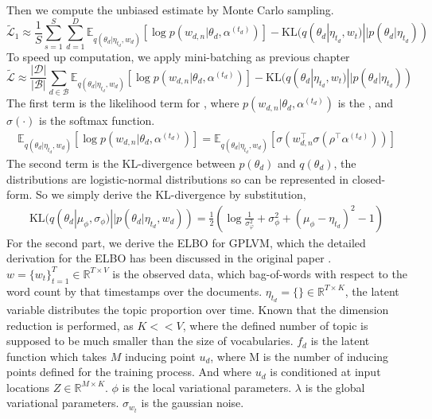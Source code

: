 Then we compute the unbiased estimate by Monte Carlo sampling.
\begin{equation}
\tilde{\mathcal{L}}_{1}\approx\frac{1}{S}\sum_{s=1}^{S}\sum_{d=1}^{D}\mathbb{E}_{ q(\theta_d|\eta_{t_d},w_d)}[\log p(w_{d,n}|\theta_d,\alpha^{(t_d)})]-\text{KL}(q(\theta_d|\eta_{t_d},w_t)||p(\theta_d|\eta_{t_d}))
\end{equation}
To speed up computation, we apply mini-batching as previous chapter
\begin{equation}
\tilde{\mathcal{L}}\approx\frac{|\mathcal{D}|}{|\mathcal{B}|}\sum_{d\in\mathcal{B}}\mathbb{E}_{ q(\theta_d|\eta_{t_d},w_d)}[\log p(w_{d,n}|\theta_d,\alpha^{(t_d)})]-\text{KL}(q(\theta_d|\eta_{t_d},w_t)||p(\theta_d|\eta_{t_d}))
\end{equation}
The first term is the likelihood term for , where $ p(w_{d,n}|\theta_d,\alpha^{(t_d)}) $ is the , and $ \sigma(\cdot) $ is the softmax function.
\begin{align}
\mathbb{E}_{ q(\theta_d|\eta_{t_d},w_d)}[\log p(w_{d,n}|\theta_d,\alpha^{(t_d)})]=\mathbb{E}_{ q(\theta_d|\eta_{t_d},w_d)}[\sigma(w_{d,n}^\top\sigma(\rho^\top\alpha^{(t_d)}))]
\end{align}
The second term is the KL-divergence between $ p(\theta_d) $ and $ q(\theta_d) $, the distributions are logistic-normal distributions so can be represented in closed-form. So we simply derive the KL-divergence by substitution,
\begin{align}\label{eq:ch5_kl_theta}
\text{KL}(q(\theta_d|\mu_\phi,\sigma_\phi)||p(\theta_d|\eta_{t_d},w_d))=\frac{1}{2}\left(\log\frac{1}{\sigma_\varphi^2}+\sigma_\phi^2+(\mu_\phi-\eta_{t_d})^2-1\right)
\end{align}
For the second part, we derive the ELBO for GPLVM, which the detailed derivation for the ELBO has been discussed in the original paper \cite{titsias_bayesian_nodate}. $ w=\{w_t\}^{T}_{t=1}\in\mathbb{R}^{T\times V} $ is the observed data, which bag-of-words with respect to the word count by that timestamps over the documents. $ \eta_{t_d}=\{\}\in\mathbb{R}^{T\times K} $, the latent variable distributes the topic proportion over time. Known that the dimension reduction is performed, as $ K<<V $, where the defined number of topic is supposed to be much smaller than the size of vocabularies.
$ f_d $ is the latent function which takes $ M $ inducing point $ u_d $, where M is the number of inducing points defined for the training process. And where $ u_d $ is conditioned at input locations $ Z\in\mathbb{R}^{M\times K} $. 
$ \phi $ is the local variational parameters. $ \lambda $ is the global variational parameters. $ \sigma_{w_t} $ is the gaussian noise.

